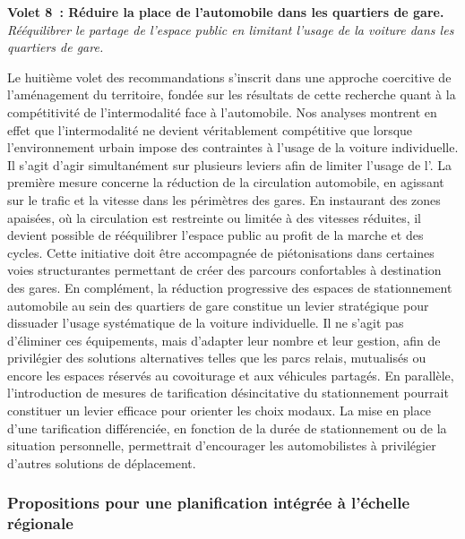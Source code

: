 \begin{refsegment}
    \begin{displayquote}
\textbf{Volet 8~: Réduire la place de l'automobile dans les quartiers de gare.}
\\
\textsl{Rééquilibrer le partage de l’espace public en limitant l’usage de la voiture dans les quartiers de gare.}
    \end{displayquote}
Le huitième volet des recommandations s’inscrit dans une approche coercitive de l’aménagement du territoire, fondée sur les résultats de cette recherche quant à la compétitivité de l’intermodalité face à l’automobile. Nos analyses montrent en effet que l’intermodalité ne devient véritablement compétitive que lorsque l’environnement urbain impose des contraintes à l’usage de la voiture individuelle. Il s’agit d’agir simultanément sur plusieurs leviers afin de limiter l’usage de l'. La première mesure concerne la réduction de la circulation automobile, en agissant sur le trafic et la vitesse dans les périmètres des gares. En instaurant des zones apaisées, où la circulation est restreinte ou limitée à des vitesses réduites, il devient possible de rééquilibrer l’espace public au profit de la marche et des cycles. Cette initiative doit être accompagnée de piétonisations dans certaines voies structurantes permettant de créer des parcours confortables à destination des gares. En complément, la réduction progressive des espaces de stationnement automobile au sein des quartiers de gare constitue un levier stratégique pour dissuader l’usage systématique de la voiture individuelle. Il ne s’agit pas d’éliminer ces équipements, mais d’adapter leur nombre et leur gestion, afin de privilégier des solutions alternatives telles que les parcs relais, mutualisés ou encore les espaces réservés au covoiturage et aux véhicules partagés. En parallèle, l’introduction de mesures de tarification désincitative du stationnement pourrait constituer un levier efficace pour orienter les choix modaux. La mise en place d’une tarification différenciée, en fonction de la durée de stationnement ou de la situation personnelle, permettrait d’encourager les automobilistes à privilégier d’autres solutions de déplacement.%

\subsubsection*{Propositions pour une planification intégrée à l'échelle régionale
    \label{conclusion-generale:implications-planification}
    }


\end{refsegment}
